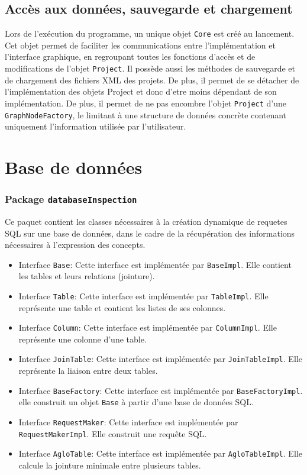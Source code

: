 \documentclass[12pt]{report}
\begin{document}
\subsection{Accès aux données, sauvegarde et chargement}

    Lors de l'exécution du programme, un unique objet \texttt{Core} est créé au lancement. Cet objet permet de faciliter les communications entre l'implémentation et l'interface graphique, en regroupant toutes les fonctions d'accès et de
modifications de l'objet \texttt{Project}. Il possède aussi les méthodes de sauvegarde et de chargement des fichiers XML des projets. De plus, il permet de se détacher de l'implémentation des objets Project et donc d'etre moins dépendant de son
implémentation.
    De plus, il permet de ne pas encombre l'objet \texttt{Project} d'une \texttt{GraphNodeFactory}, le limitant à une structure de données concrète contenant uniquement l'information utilisée par l'utilisateur.

\section{Base de données}

\subsubsection*{Package \texttt{databaseInspection}}

    Ce paquet contient les classes nécessaires à la création dynamique de requetes SQL sur une base de données, dans le cadre de la récupération des informations nécessaires à l'expression des concepts.

\begin{itemize}
\item Interface \texttt{Base}: Cette interface est implémentée par \texttt{BaseImpl}. Elle contient les tables et leurs relations (jointure).
\item Interface \texttt{Table}: Cette interface est implémentée par \texttt{TableImpl}. Elle représente une table et contient les listes de ses colonnes.
\item Interface \texttt{Column}: Cette interface est implémentée par \texttt{ColumnImpl}. Elle représente une colonne d'une table.
\item Interface \texttt{JoinTable}: Cette interface est implémentée par \texttt{JoinTableImpl}. Elle représente la liaison entre deux tables.
\item Interface \texttt{BaseFactory}: Cette interface est implémentée par \texttt{BaseFactoryImpl}. elle construit un objet \texttt{Base} à partir d'une base de données SQL.
\item Interface \texttt{RequestMaker}: Cette interface est implémentée par \texttt{RequestMakerImpl}. Elle construit une requête SQL.
\item Interface \texttt{AgloTable}: Cette interface est implémentée par \texttt{AgloTableImpl}. Elle calcule la jointure minimale entre plusieurs tables.
\end{itemize}
\end{document}
